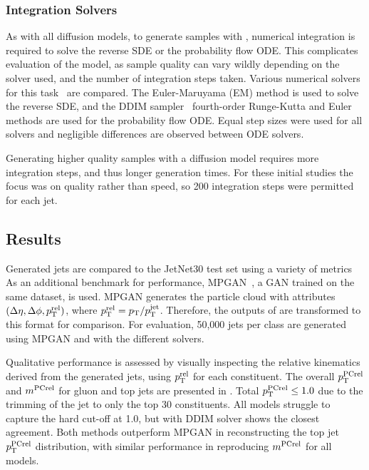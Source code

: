 \subsubsection{Integration Solvers}

As with all diffusion models, to generate samples with \pcjedi, numerical integration is required to solve the reverse SDE or the probability flow ODE\@.
This complicates evaluation of the model, as sample quality can vary wildly depending on the solver used, and the number of integration steps taken.
Various numerical solvers for this task~\cite{NumericalSolutionStochastic} are compared.
The Euler-Maruyama (EM) method is used to solve the reverse SDE, and the DDIM sampler~\cite{DDIM} fourth-order Runge-Kutta and Euler methods are used for the probability flow ODE.
Equal step sizes were used for all solvers and negligible differences are observed between ODE solvers.

Generating higher quality samples with a diffusion model requires more integration steps, and thus longer generation times.
For these initial studies the focus was on quality rather than speed, so 200 integration steps were permitted for each jet.

\subsection{Results}

Generated jets are compared to the JetNet30 test set using a variety of metrics
As an additional benchmark for performance, MPGAN~\cite{MPGAN}, a GAN trained on the same dataset, is used.
MPGAN generates the particle cloud with attributes $(\Delta\eta, \Delta\phi, p_\mathrm{T}^\text{rel})$, where $p_\mathrm{T}^\text{rel} = p_\mathrm{T} / p_\mathrm{T}^{\text{jet}}$.
Therefore, the outputs of \pcjedi are transformed to this format for comparison.
For evaluation, 50,000 jets per class are generated using MPGAN and \pcjedi with the different solvers.

Qualitative performance is assessed by visually inspecting the relative kinematics derived from the generated jets, using $p_\mathrm{T}^\text{rel}$ for each constituent.
The overall $p_\mathrm{T}^{\text{PCrel}}$ and $m^{\text{PCrel}}$ for gluon and top jets are presented in .
Total $p_\mathrm{T}^{\text{PCrel}}\leq1.0$ due to the trimming of the jet to only the top 30 constituents.
All models struggle to capture the hard cut-off at 1.0, but \pcjedi with DDIM solver shows the closest agreement.
Both \pcjedi methods outperform MPGAN in reconstructing the top jet $p_\mathrm{T}^{\text{PCrel}}$ distribution, with similar performance in reproducing $m^{\text{PCrel}}$ for all models.


